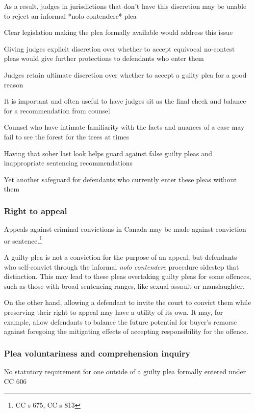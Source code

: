 As a result, judges in jurisdictions that don't have this discretion may be unable to reject an informal *nolo contendere* plea

Clear legislation making the plea formally available would address this issue

Giving judges explicit discretion over whether to accept equivocal no-contest pleas would give further protections to defendants who enter them

Judges retain ultimate discretion over whether to accept a guilty plea for a good reason

It is important and often useful to have judges sit as the final check and balance for a recommendation from counsel

Counsel who have intimate familiarity with the facts and nuances of a case may fail to see the forest for the trees at times

Having that sober last look helps guard against false guilty pleas and inappropriate sentencing recommendations

Yet another safeguard for defendants who currently enter these pleas without them

\subsubsection{Right to appeal}

Appeals against criminal convictions in Canada may be made against conviction or sentence.\footnote{CC s 675, CC s 813}

A guilty plea is not a conviction for the purpose of an appeal, but defendants who self-convict through the informal \textit{nolo contendere} procedure sidestep that distinction. This may lead to these pleas overtaking guilty pleas for some offences, such as those with broad sentencing ranges, like sexual assault or manslaughter. 

On the other hand, allowing a defendant to invite the court to convict them while preserving their right to appeal may have a utility of its own. It may, for example, allow defendants to balance the future potential for buyer's remorse against foregoing the mitigating effects of accepting responsibility for the offence. 

\subsubsection{Plea voluntariness and comprehension inquiry}

No statutory requirement for one outside of a guilty plea formally entered under CC 606

